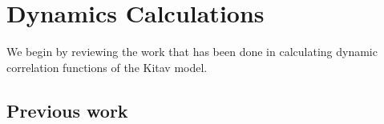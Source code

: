 \documentclass[aps,pra,preprint,groupedaddress]{revtex4-1}
\newcommand{\1}{\mathds{1}}
\begin{document}
%
%


\section{Dynamics Calculations} 


We begin by reviewing the work that has been done in calculating dynamic correlation functions of the Kitav model.

\subsection{Previous work}
\end{document}
